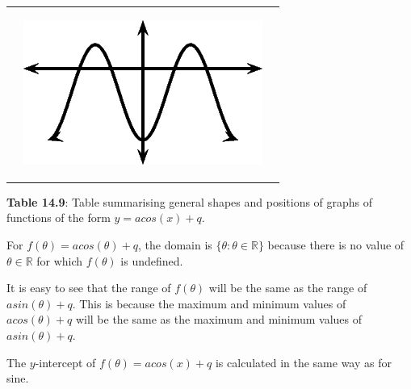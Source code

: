 \begin{center}
\begin{xtabular*}{\mytablewidth}[t]{|p{10\mystarwidth}|p{10\mystarwidth}|p{10\mystarwidth}|}
\begin{center}
\end{center}    
    &
\setcounter{subfigure}{0}
\label{m39414*id88246}
\begin{center}
\label{m39414*id88246!!!underscore!!!media}\label{m39414*id88246!!!underscore!!!printimage}\includegraphics{col11306.imgs/m39414_MG10C15_029.png} %
\vspace{2pt}
\vspace{.1in}
\end{center}    
\tabularnewline{}
\end{xtabular*}
\end{center}
\begin{center}{\small\bfseries Table 14.9}: Table summarising general shapes and positions of graphs of functions of the form $y=acos\left(x\right)+q$.\end{center}
\par
\label{m39414*uid66}
\nopagebreak
\label{m39414*id88263}For $f\left(\theta \right)=acos\left(\theta \right)+q$, the domain is $\{\theta :\theta \in \mathbb{R}\}$ because there is no value of $\theta \in \mathbb{R}$ for which $f\left(\theta \right)$ is undefined.\par 
\label{m39414*id88363}It is easy to see that the range of $f\left(\theta \right)$ will be the same as the range of $asin\left(\theta \right)+q$. This is because the maximum and minimum values of $acos\left(\theta \right)+q$ will be the same as the maximum and minimum values of $asin\left(\theta \right)+q$.\par 
\label{m39414*uid67}
\nopagebreak
\label{m39414*id88468}The $y$-intercept of $f\left(\theta \right)=acos\left(x\right)+q$ is calculated in the same way as for sine.\par 
